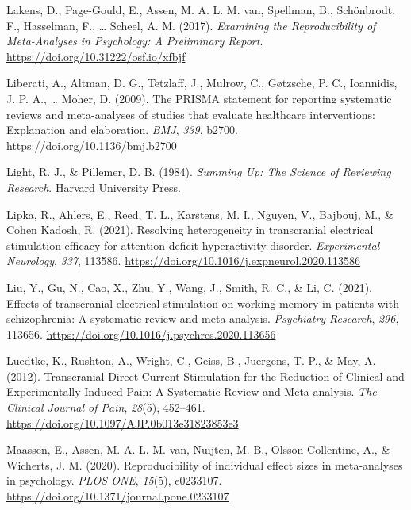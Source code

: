 \documentclass[
  man,floatsintext]{apa6}
\newlength{\cslhangindent}
\newlength{\cslentryspacingunit} %
\newenvironment{CSLReferences}[2] %
 {%
  \setlength{\parindent}{0pt}
  \ifodd #1
  \let\oldpar\par
  \def\par{\hangindent=\cslhangindent\oldpar}
  \fi
  \setlength{\parskip}{#2\cslentryspacingunit}
 }%
 {}
\begin{document}
\begin{CSLReferences}{1}{0}
\leavevmode{}%
Lakens, D., Page-Gould, E., Assen, M. A. L. M. van, Spellman, B., Schönbrodt, F., Hasselman, F., \ldots{} Scheel, A. M. (2017). \emph{Examining the {Reproducibility} of {Meta-Analyses} in {Psychology}: {A Preliminary Report}}. \url{https://doi.org/10.31222/osf.io/xfbjf}

\leavevmode{}%
Liberati, A., Altman, D. G., Tetzlaff, J., Mulrow, C., Gøtzsche, P. C., Ioannidis, J. P. A., \ldots{} Moher, D. (2009). The {PRISMA} statement for reporting systematic reviews and meta-analyses of studies that evaluate healthcare interventions: Explanation and elaboration. \emph{BMJ}, \emph{339}, b2700. \url{https://doi.org/10.1136/bmj.b2700}

\leavevmode{}%
Light, R. J., \& Pillemer, D. B. (1984). \emph{Summing {Up}: {The Science} of {Reviewing Research}}. {Harvard University Press}.

\leavevmode{}%
Lipka, R., Ahlers, E., Reed, T. L., Karstens, M. I., Nguyen, V., Bajbouj, M., \& Cohen Kadosh, R. (2021). Resolving heterogeneity in transcranial electrical stimulation efficacy for attention deficit hyperactivity disorder. \emph{Experimental Neurology}, \emph{337}, 113586. \url{https://doi.org/10.1016/j.expneurol.2020.113586}

\leavevmode{}%
Liu, Y., Gu, N., Cao, X., Zhu, Y., Wang, J., Smith, R. C., \& Li, C. (2021). Effects of transcranial electrical stimulation on working memory in patients with schizophrenia: {A} systematic review and meta-analysis. \emph{Psychiatry Research}, \emph{296}, 113656. \url{https://doi.org/10.1016/j.psychres.2020.113656}

\leavevmode{}%
Luedtke, K., Rushton, A., Wright, C., Geiss, B., Juergens, T. P., \& May, A. (2012). Transcranial {Direct Current Stimulation} for the {Reduction} of {Clinical} and {Experimentally Induced Pain}: {A Systematic Review} and {Meta-analysis}. \emph{The Clinical Journal of Pain}, \emph{28}(5), 452--461. \url{https://doi.org/10.1097/AJP.0b013e31823853e3}

\leavevmode{}%
Maassen, E., Assen, M. A. L. M. van, Nuijten, M. B., Olsson-Collentine, A., \& Wicherts, J. M. (2020). Reproducibility of individual effect sizes in meta-analyses in psychology. \emph{PLOS ONE}, \emph{15}(5), e0233107. \url{https://doi.org/10.1371/journal.pone.0233107}


\end{CSLReferences}
\end{document}
